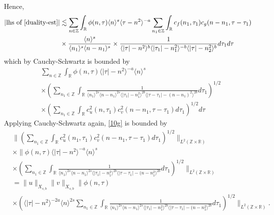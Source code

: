 \documentclass[12pt,reqno]{amsart}
\numberwithin{equation}{section}  %
\numberwithin{figure}{section}
\newcommand{\rr}{\mathbb{R}}
\newcommand{\zz}{\mathbb{Z}}
\theoremstyle{plain}
\theoremstyle{definition}
\theoremstyle{remark}
\begin{document}
%
%
Hence, 
%
%
\begin{equation*}
	\begin{split}
    |\text{lhs of} \ \eqref{duality-est}|
	& \lesssim \sum_{n \in \zz} \int_{\rr} \phi(n, \tau) \langle n \rangle^s \langle \tau - n^{2} \rangle^{-a}
  \sum_{n_1 \in \zz}
  \int_{\rr} c_f(n_1, \tau_1)
		c_g(n - n_1, \tau - \tau_1 )
		\\
    & \times \frac{\langle n \rangle ^{s}}{\langle n_{1} \rangle ^{s} \langle
    n-n_{1} \rangle ^{s}} \times \frac{1}{\langle |\tau| - n^{2} \rangle
    ^{b}\langle |\tau_{1}|-n_{1}^{2} \rangle ^{-b}\langle | \tau|-n_{2}^{2}
    \rangle ^{b}} d \tau_1 d \tau
	\end{split}
\end{equation*}
%
%
which by Cauchy-Schwartz is bounded by
%
%
\begin{equation}
	\label{10g}
	\begin{split}
    & \sum_{n \in \zz} \int_{\rr} \phi(n, \tau) \langle | \tau | - n^{2} \rangle
    ^{-a} \langle n \rangle ^{s}
    \\
    & \times \left( \sum_{n_{1} \in \zz} \int_{\rr}
    \frac{1}{\langle n_{1} \rangle ^{2s} \langle n-n_{1} \rangle ^{2s} \langle |
    \tau_{1} | - n_{1}^{2}\rangle ^{2b} \langle | \tau - \tau_{1} | -
    (n - n_{1})^{2} \rangle ^{2b}} d \tau_{1} \right)^{1/2}
    \\
    & \times \left( \sum_{n_{1} \in \zz} \int_{\rr} c_{u}^{2}(n, \tau_{1})
    c_{v}^{2}(n - n_{1}, \tau - \tau_{1}) d \tau_{1} \right)^{1/2} d \tau
  \end{split}
\end{equation}
%
%
Applying Cauchy-Schwartz again, \eqref{10g} is bounded by
%
%
\begin{equation*}
  \begin{split}
  & \|\left( \sum_{n_{1} \in \zz }\int_{\rr } c_{u}^{2}(n_1, \tau_1)
  c_{v}^{2} (n - n_1, \tau - \tau_{1} ) d \tau_1  \right)^{1/2} \|_{L^{2}(\zz \times
		\rr)}
		\\
    & \times  \|\phi(n, \tau) \langle | \tau | - n^{2} \rangle ^{-a} \langle n
    \rangle ^{s}
		\\
    & \times \left( \sum_{n_{1} \in \zz} \int_{\rr} \frac{1}{ \langle n_{1}
    \rangle ^{2s} \langle n-n_{1} \rangle ^{2s} \langle | \tau_{1}|-n_{1}^{2}
    \rangle^{2b} \langle  |\tau -
    \tau_{1} | -(n - n_{1}^{2}
    \rangle^{2b} } d \tau_1 \right)^{1/2} \|_{L^2(\zz \times \rr)}
		\\
    & = \|u\|_{X_{s,b}} \|v\|_{X_{s,b}} \label{holder-term}
     \|\phi(n, \tau)     \\
    & \times \left( \langle | \tau | - n^{2} \rangle ^{-2a} \langle n
    \rangle ^{2s}
\sum_{n_{1} \in \zz} \int_{\rr} \frac{1}{ \langle n_{1} \rangle ^{2s} \langle
n-n_{1} \rangle ^{2s}  \langle | \tau_{1}|-n_{1}^{2} \rangle^{2b} \langle  |\tau -
    \tau_{1} | -(n - n_{1}^{2}
    \rangle^{2b} } d \tau_1 \right)^{1/2} \|_{L^2(\zz \times \rr)}.
  \end{split}
\end{equation*}
\end{document}
